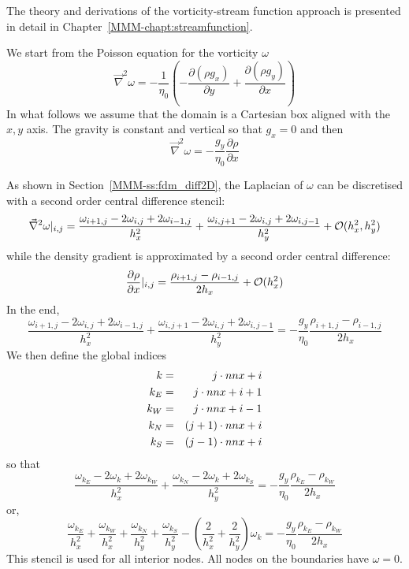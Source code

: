 

The theory and derivations of the vorticity-stream function approach is 
presented in detail in Chapter~\ref{MMM-chapt:streamfunction}.

We start from the Poisson equation for the vorticity $\omega$
\begin{equation}
\vec\nabla^2 \omega = -\frac{1}{\eta_0} \left( -\frac{\partial (\rho g_x)}{\partial y}
+\frac{\partial (\rho g_y)}{\partial x} \right)
\end{equation}
In what follows we assume that the domain is a Cartesian box aligned 
with the $x,y$ axis. The gravity is constant and vertical so that $g_x=0$ and
then 
\begin{equation}
\vec\nabla^2 \omega 
= -\frac{g_y}{\eta_0} 
\frac{\partial \rho}{\partial x} 
\end{equation}

As shown in Section~\ref{MMM-ss:fdm_diff2D}, the Laplacian of $\omega$
can be discretised with a second order central difference stencil:
\[
\vec\nabla^2 \omega |_{i,j} 
= \frac{\omega_{i+1,j} -2\omega_{i,j} + 2\omega_{i-1,j}}{h_x^2}
+ \frac{\omega_{i,j+1} -2\omega_{i,j} + 2\omega_{i,j-1}}{h_y^2}
+{\cal O}(h_x^2,h_y^2)
\]
while the density gradient is approximated by a second order
central difference:
\[
\frac{\partial \rho}{\partial x}|_{i,j} 
= \frac{\rho_{i+1,j}-\rho_{i-1,j}}{2 h_x} + {\cal O}(h_x^2)
\]
In the end, 
\[
\frac{\omega_{i+1,j} -2\omega_{i,j} + 2\omega_{i-1,j}}{h_x^2}
+ \frac{\omega_{i,j+1} -2\omega_{i,j} + 2\omega_{i,j-1}}{h_y^2}
= -\frac{g_y}{\eta_0} 
\frac{\rho_{i+1,j}-\rho_{i-1,j}}{2 h_x} 
\]
We then define the global indices
\begin{eqnarray}
k  &=& j \cdot nnx + i \nonumber\\
k_E &=& j \cdot nnx + i+1 \nonumber\\
k_W &=& j \cdot nnx + i-1 \nonumber\\
k_N &=& (j+1) \cdot nnx + i \nonumber\\
k_S &=& (j-1) \cdot nnx + i \nonumber
\end{eqnarray}
so that 
\[
\frac{\omega_{k_E} -2\omega_{k} + 2\omega_{k_W}}{h_x^2}
+ 
\frac{\omega_{k_N} -2\omega_{k} + 2\omega_{k_S}}{h_y^2}
= -\frac{g_y}{\eta_0} 
\frac{\rho_{k_E}-\rho_{k_W}}{2 h_x} 
\]
or, 
\[
\frac{\omega_{k_E}}{h_x^2}+
\frac{\omega_{k_W}}{h_x^2}+
\frac{\omega_{k_N}}{h_y^2}+
\frac{\omega_{k_S}}{h_y^2}-
\left(\frac{2}{h_x^2} + \frac{2}{h_y^2} \right) \omega_k
= -\frac{g_y}{\eta_0} 
\frac{\rho_{k_E}-\rho_{k_W}}{2 h_x} 
\]
This stencil is used for all interior nodes. All nodes on the boundaries 
have $\omega=0$.

